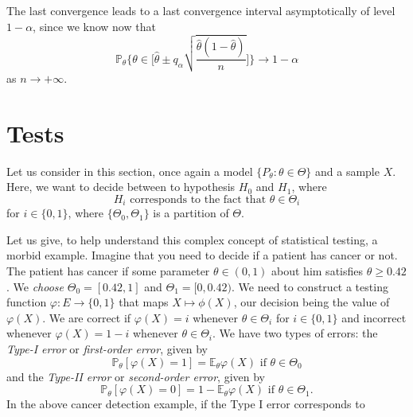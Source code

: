 \documentclass[
	fontsize=11pt, %
	twoside=false, %
	numbers=noenddot, %
]{kaobook}
\renewcommand{\P}{\mathbb P}
\newcommand{\E}{\mathbb E}
\newcommand{\wh}{\widehat}
\newcommand{\goes}{\rightarrow}
\begin{document}
The last convergence leads to a last convergence interval asymptotically of level $1 - \alpha$, since we know now that
\begin{equation*}
	\P_\theta \bigg\{ \theta \in \Big[ \wh \theta \pm q_\alpha \sqrt{\frac{\wh \theta (1 - \wh \theta)}{n}} \Big] \bigg\} \goes 1 - \alpha
\end{equation*}
as $n \goes +\infty$.


\section{Tests} %
\label{sec:tests}

Let us consider in this section, once again a model $\{ P_\theta : \theta \in \Theta \}$ and a sample $X$.
Here, we want to decide between to hypothesis $H_0$ and $H_1$, where
\begin{equation*}
	H_i \text{ corresponds to the fact that } \theta \in \Theta_i
\end{equation*}
for $i \in \{ 0, 1 \}$, where $\{ \Theta_0, \Theta_1 \}$ is a partition of $\Theta$.

Let us give, to help understand this complex concept of statistical testing, a morbid example.
Imagine that you need to decide if a patient has cancer or not.
The patient has cancer if some parameter $\theta \in (0, 1)$ about him satisfies 
$\theta \geq 0.42$.
We \emph{choose} $\Theta_0 = [0.42, 1]$ and $\Theta_1 = [0, 0.42)$.
We need to construct a testing function $\varphi : E \goes \{ 0, 1 \}$ that maps $X \mapsto \phi(X)$, our decision being the value of $\varphi(X)$.
We are correct if $\varphi(X) = i$ whenever $\theta \in \Theta_i$ for $i \in \{ 0, 1 \}$ and incorrect whenever  $\varphi(X) = 1 - i$ whenever $\theta \in \Theta_i$.
We have two types of errors: the \emph{Type-I error} or \emph{first-order error}, given by 
\begin{equation}
	\label{eq:type-1-error}
	\P_\theta[ \varphi(X) = 1] = \E_\theta \varphi(X) \text{ if } 
	\theta \in \Theta_0
\end{equation}
and the \emph{Type-II error} or \emph{second-order error}, given by 
\begin{equation}
	\label{eq:type-2-error}
	\P_\theta[ \varphi(X) = 0] = 1 - \E_\theta \varphi(X) \text{ if } 
	\theta \in \Theta_1.
\end{equation}
In the above cancer detection example, if the Type I error corresponds to 
\end{document}
